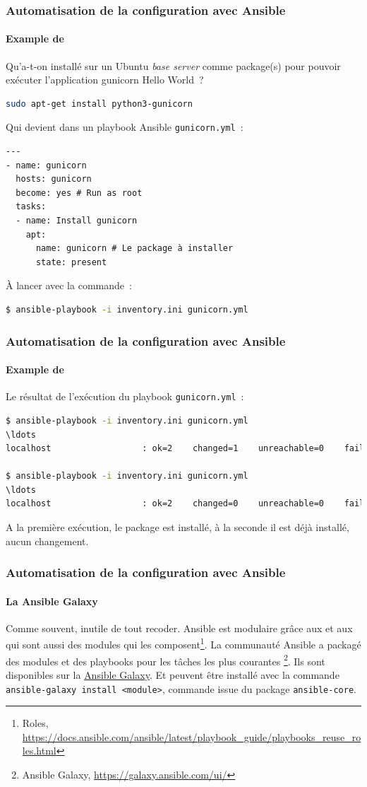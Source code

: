 \documentclass{beamer}
\begin{document}
    \begin{frame}[fragile]
        \transdissolve
        \frametitle{Automatisation de la configuration avec Ansible}
        \framesubtitle{Example de }
        Qu'a-t-on installé sur un Ubuntu \textit{base server} comme package(s) pour pouvoir exécuter l'application gunicorn Hello World~?
        \pause
        \begin{lstlisting}[language=bash]
sudo apt-get install python3-gunicorn
        \end{lstlisting}
        Qui devient dans un playbook Ansible \lstinline{gunicorn.yml}~:
        \begin{lstlisting}
---
- name: gunicorn
  hosts: gunicorn
  become: yes # Run as root
  tasks:
  - name: Install gunicorn
    apt:
      name: gunicorn # Le package à installer
      state: present
        \end{lstlisting}
        À lancer avec la commande~:
        \begin{lstlisting}[language=bash]
$ ansible-playbook -i inventory.ini gunicorn.yml
        \end{lstlisting}
    \end{frame}

    \begin{frame}[fragile]
        \transdissolve
        \frametitle{Automatisation de la configuration avec Ansible}
        \framesubtitle{Example de }
        Le résultat de l'exécution du playbook \lstinline{gunicorn.yml}~:
        \begin{lstlisting}[language=bash]
$ ansible-playbook -i inventory.ini gunicorn.yml
\ldots
localhost                  : ok=2    changed=1    unreachable=0    failed=0    skipped=0    rescued=0    ignored=0

$ ansible-playbook -i inventory.ini gunicorn.yml
\ldots
localhost                  : ok=2    changed=0    unreachable=0    failed=0    skipped=0    rescued=0    ignored=0
        \end{lstlisting}
        A la première exécution, le package est installé, à la seconde il est déjà installé, aucun changement.
    \end{frame}

    \begin{frame}
        \transdissolve
        \frametitle{Automatisation de la configuration avec Ansible}
        \framesubtitle{La Ansible Galaxy}
        Comme souvent, inutile de tout recoder.
        Ansible est modulaire grâce aux  et aux  qui sont aussi des modules qui les composent\footnote{Roles, \url{https://docs.ansible.com/ansible/latest/playbook_guide/playbooks_reuse_roles.html}}.
        \bigbreak
        La communauté Ansible a packagé des modules et des playbooks pour les tâches les plus courantes \footnote{Ansible Galaxy, \url{https://galaxy.ansible.com/ui/}}.
        Ils sont disponibles sur la \href{https://galaxy.ansible.com/}{Ansible Galaxy}.
        Et peuvent être installé avec la commande \lstinline{ansible-galaxy install <module>}, commande issue du package \lstinline{ansible-core}.
    \end{frame}
\end{document}
